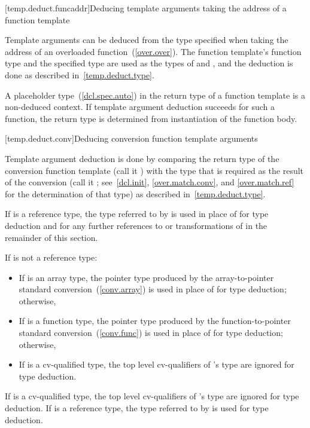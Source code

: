[temp.deduct.funcaddr]{Deducing template arguments taking the address of a function template}

\pnum
Template arguments can be deduced from the type specified when taking
the address of an overloaded function~(\ref{over.over}).
The function template's function type and the specified type
are used as the types of
and
,
and the deduction is done as
described in~\ref{temp.deduct.type}.

\pnum
A placeholder type~(\ref{dcl.spec.auto}) in the return type of a
function template is a non-deduced context. If template argument
deduction succeeds for such a function, the return type is determined
from instantiation of the function body.

[temp.deduct.conv]{Deducing conversion function template arguments}

\pnum
Template argument deduction is done by comparing the return type of
the
conversion function template
(call it
)
with the type that is
required as the result of the conversion (call it
; see~\ref{dcl.init}, \ref{over.match.conv}, and \ref{over.match.ref}
for the determination of that type)
as described in~\ref{temp.deduct.type}.

\pnum
If  is a reference type, the type referred to by  is used in place
of  for type deduction and for any further references to or transformations of
 in the remainder of this section.

\pnum
If
is not a reference type:

\begin{itemize}
\item
If
is an array type, the pointer type produced by the
array-to-pointer standard conversion~(\ref{conv.array}) is used in place of
for type
deduction; otherwise,
\item
If
is a function type, the pointer type produced by the
function-to-pointer standard conversion~(\ref{conv.func}) is used in place of
for
type deduction; otherwise,
\item
If
is a cv-qualified type, the top level cv-qualifiers of
's
type are ignored for type deduction.
\end{itemize}

\pnum
If
is a cv-qualified type, the top level cv-qualifiers of
's
type are ignored for type deduction.
If
is a
reference type, the type referred to by
is used for type deduction.


